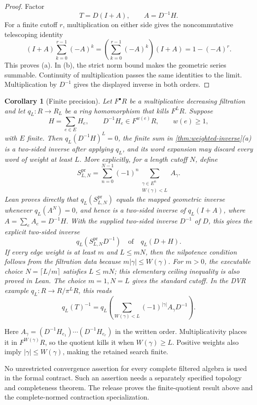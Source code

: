 \documentclass[11pt,a4paper]{article}
\newtheorem{corollary}[corollary]{Corollary}
\theoremstyle{definition}
\theoremstyle{remark}
\theoremstyle{definition}\newtheorem{construction}[theorem]{Construction}\newtheorem{certificate}[theorem]{Numerical Certificate}
\theoremstyle{remark}\newtheorem{boundary}[theorem]{Boundary}
\begin{document}
\begin{proof}
Factor
\[
T=D(I+A),
\qquad A=D^{-1}H.
\]
For a finite cutoff $r$, multiplication on either side gives the
noncommutative telescoping identity
\[
(I+A)\sum_{k=0}^{r-1}(-A)^k
=
\left(\sum_{k=0}^{r-1}(-A)^k\right)(I+A)
=1-(-A)^r.
\]
This proves (a). In (b), the strict norm bound makes the geometric series
summable. Continuity of multiplication passes the same identities to the
limit. Multiplication by $D^{-1}$ gives the displayed inverse in both orders.
\end{proof}

\begin{corollary}[Finite precision]\label{cor:finite-precision}
Let $F^\bullet R$ be a multiplicative decreasing filtration and let
$q_L:R\to R_L$ be a ring homomorphism that kills $F^L R$. Suppose
\[
H=\sum_{e\in E}H_e,
\qquad D^{-1}H_e\in F^{w(e)}R,
\qquad w(e)\ge1,
\]
with $E$ finite. Then $q_L(D^{-1}H)^L=0$, the finite sum in
\cref{thm:weighted-inverse}(a) is a two-sided inverse after applying $q_L$,
and its word expansion may discard every word of weight at least $L$.
More explicitly, for a length cutoff $N$, define
\[
S^{\mathrm{pr}}_{L,N}
=
\sum_{n=0}^{N-1}(-1)^n
\sum_{\substack{\gamma\in E^n\\W(\gamma)<L}}A_\gamma.
\]
Lean proves directly that $q_L(S^{\mathrm{pr}}_{L,N})$ equals the mapped
geometric inverse whenever $q_L(A^N)=0$, and hence is a two-sided inverse of
$q_L(I+A)$, where $A=\sum_eA_e=D^{-1}H$. With the supplied two-sided
inverse $D^{-1}$ of $D$, this gives the explicit two-sided inverse
\[
\boxed{q_L\!\left(S^{\mathrm{pr}}_{L,N}D^{-1}\right)}
\quad\text{of}\quad q_L(D+H).
\]
If every edge weight is at least $m$ and $L\le mN$, then the nilpotence
condition follows from the filtration data because
$m|\gamma|\le W(\gamma)$. For $m>0$, the executable choice
$N=\lceil L/m\rceil$ satisfies $L\le mN$; this elementary ceiling inequality
is also proved in Lean. The choice $m=1,N=L$ gives the standard cutoff.
In the DVR example $q_L:R\to R/\pi^L R$, this reads
\[
q_L(T)^{-1}
=
q_L\!\left(\sum_{W(\gamma)<L}
(-1)^{|\gamma|}A_\gamma D^{-1}\right).
\]
\end{corollary}

Here $A_\gamma=(D^{-1}H_{e_1})\cdots(D^{-1}H_{e_r})$ in the written
order. Multiplicativity places it in $F^{W(\gamma)}R$, so the quotient kills
it when $W(\gamma)\ge L$. Positive weights also imply
$|\gamma|\le W(\gamma)$, making the retained search finite.

No unrestricted convergence assertion for every complete filtered algebra is
used in the formal contract. Such an assertion needs a separately specified
topology and completeness theorem. The release proves the finite-quotient
result above and the complete-normed contraction specialization.
\end{document}
